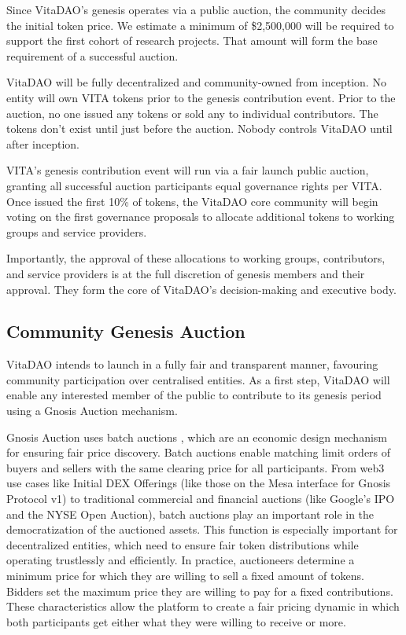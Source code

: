 \documentclass[10pt,letterpaper]{article}
\begin{document}
Since VitaDAO's genesis operates via a public auction, the community decides the initial token price. We estimate a minimum of \$2,500,000 will be required to support the first cohort of research projects. That amount will form the base requirement of a successful auction.

VitaDAO will be fully decentralized and community-owned from inception. No entity will own VITA tokens prior to the genesis contribution event. Prior to the auction, no one issued any tokens or sold any to individual contributors. The tokens don't exist until just before the auction. Nobody controls VitaDAO until after inception.

VITA’s genesis contribution event will run via a fair launch public auction, granting all successful auction participants equal governance rights per VITA. Once issued the first 10\% of tokens, the VitaDAO core community will begin voting on the first governance proposals to allocate additional tokens to working groups and service providers.

Importantly, the approval of these allocations to working groups, contributors, and service providers is at the full discretion of genesis members and their approval. They form the core of VitaDAO's decision-making and executive body.

\subsection{Community Genesis Auction}
VitaDAO intends to launch in a fully fair and transparent manner, favouring community participation over centralised entities. As a first step, VitaDAO will enable any interested member of the public to contribute to its genesis period using a Gnosis Auction mechanism.

Gnosis Auction uses batch auctions \citep{BatchAuctions}, which are an economic design mechanism for ensuring fair price discovery. Batch auctions enable matching limit orders of buyers and sellers with the same clearing price for all participants. From web3 use cases like Initial DEX Offerings (like those on the Mesa interface for Gnosis Protocol v1) to traditional commercial and financial auctions (like Google’s IPO and the NYSE Open Auction), batch auctions play an important role in the democratization of the auctioned assets. This function is especially important for decentralized entities, which need to ensure fair token distributions while operating trustlessly and efficiently.  In practice, auctioneers determine a minimum price for which they are willing to sell a fixed amount of tokens. Bidders set the maximum price they are willing to pay for a fixed contributions. These characteristics allow the platform to create a fair pricing dynamic in which both participants get either what they were willing to receive or more.
\end{document}
